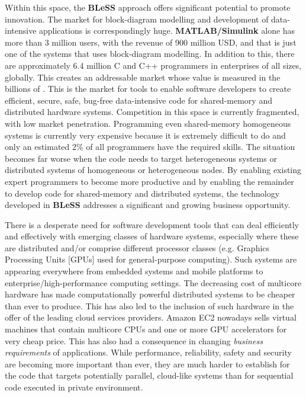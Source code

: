 \documentclass[a4paper,11pt]{article}
\newcommand{\project}[1]{\textbf{#1}\xspace}
\newcommand{\BLESS}{\project{BLeSS}}
\newcommand{\TheProject}{\BLESS}
\begin{document}
Within this space, the \TheProject{} approach offers significant potential to promote innovation.
The market for block-diagram modelling and development of data-intensive
applications is correspondingly huge. \textbf{MATLAB/Simulink} alone has
more than 3 million users, with the revenue of 900 million USD, and that
is just one of the systems that uses block-diagram modelling. In addition
to this, there are approximately 6.4 million C and C++ programmers in
enterprises of all sizes, globally. This creates an addressable market
whose value is measured in the billions of \euros. This is the market for
tools to enable software developers to create efficient, secure, safe,
bug-free data-intensive code for shared-memory and distributed hardware
systems. Competition in this space is currently fragmented, with low market
penetration. Programming even shared-memory homogeneous systems is
currently very expensive because it is extremely difficult to do and only
an estimated 2\% of all programmers have the required skills. The
situation becomes far worse when the code needs to target heterogeneous
systems or distributed systems of homogeneous or heterogeneous nodes. By
enabling existing expert programmers to become more
productive and by enabling the remainder to develop code for
shared-memory and distributed systems, the technology developed in
\TheProject{} addresses a significant and growing business opportunity.

There is a desperate need for software development tools that can deal
efficiently and effectively with emerging classes of hardware systems,
especially where these are distributed and/or comprise different
processor classes (e.g. Graphics Processing Units [GPUs] used for
general-purpose computing). Such systems are appearing everywhere from
embedded systems and mobile platforms to enterprise/high-performance
computing settings. The decreasing cost of multicore hardware has made
computationally powerful distributed systems to be cheaper than ever to
produce. This has also led to the inclusion of such hardware in the offer
of the leading cloud services providers. Amazon EC2 nowadays sells
virtual machines that contain multicore CPUs and one or more GPU
accelerators for very cheap price. This has also had a consequence in
changing \emph{business requirements} of applications. While performance,
reliability, safety and security are becoming more important than ever,
they are much harder to establish for the code that targets potentially
parallel, cloud-like systems than for sequential code executed in private
environment.
\end{document}
